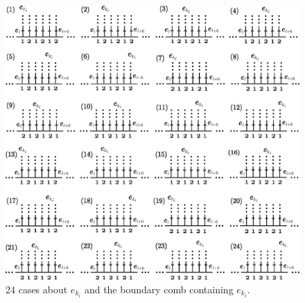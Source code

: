 \documentclass{amsart}
\theoremstyle{plain}
\theoremstyle{definition}
\begin{document}
\begin{figure}[htbp]
\begin{center}
\includegraphics[width=140mm]{24cases.eps}
\end{center}
\caption{24 cases about $e_{k_i}$ and the boundary comb containing $e_{k_i}$. }
\label{24cases}
\end{figure}
\end{document}
